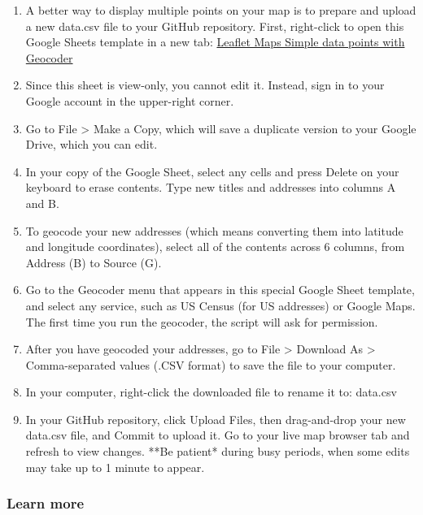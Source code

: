 \documentclass[
  english,
]{book}
\begin{document}
\begin{enumerate}
\def\labelenumi{\arabic{enumi})}
\setcounter{enumi}{17}
\item
  A better way to display multiple points on your map is to prepare and upload a new data.csv file to your GitHub repository. First, right-click to open this Google Sheets template in a new tab: \href{https://docs.google.com/spreadsheets/d/1z_0hKbw8Ff_fdp-XRoRL4YWe6ue0c0EpITveZ2rz1e8/}{Leaflet Maps Simple data points with Geocoder}
\item
  Since this sheet is view-only, you cannot edit it. Instead, sign in to your Google account in the upper-right corner.
\item
  Go to File \textgreater{} Make a Copy, which will save a duplicate version to your Google Drive, which you can edit.
\item
  In your copy of the Google Sheet, select any cells and press Delete on your keyboard to erase contents. Type new titles and addresses into columns A and B.
\item
  To geocode your new addresses (which means converting them into latitude and longitude coordinates), select all of the contents across 6 columns, from Address (B) to Source (G).
\item
  Go to the Geocoder menu that appears in this special Google Sheet template, and select any service, such as US Census (for US addresses) or Google Maps. The first time you run the geocoder, the script will ask for permission.
\item
  After you have geocoded your addresses, go to File \textgreater{} Download As \textgreater{} Comma-separated values (.CSV format) to save the file to your computer.
\item
  In your computer, right-click the downloaded file to rename it to: data.csv
\item
  In your GitHub repository, click Upload Files, then drag-and-drop your new data.csv file, and Commit to upload it. Go to your live map browser tab and refresh to view changes. **Be patient* during busy periods, when some edits may take up to 1 minute to appear.
\end{enumerate}

\hypertarget{learn-more-15}{%
\subsubsection*{Learn more}\label{learn-more-15}}
\end{document}

